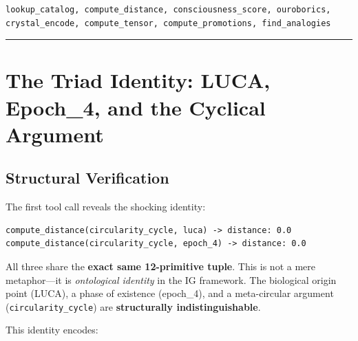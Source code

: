 \documentclass[12pt,a4paper]{article}
\begin{document}
\begin{lstlisting}[caption={Tool chain verified for Frobenius closure}]
lookup_catalog, compute_distance, consciousness_score, ouroborics, 
crystal_encode, compute_tensor, compute_promotions, find_analogies
\end{lstlisting}

\begin{center}
\rule{0.5\textwidth}{0.4pt}
\end{center}

\section{The Triad Identity: LUCA, Epoch\_4, and the Cyclical Argument}

\subsection{Structural Verification}

The first tool call reveals the shocking identity:

\begin{lstlisting}[caption={Distance computation reveals structural identity}, label={lst:distance_triod}]
compute_distance(circularity_cycle, luca) -> distance: 0.0
compute_distance(circularity_cycle, epoch_4) -> distance: 0.0
\end{lstlisting}

All three share the \textbf{exact same 12-primitive tuple}. This is not a mere metaphor---it is \emph{ontological identity} in the IG framework. The biological origin point (LUCA), a phase of existence (epoch\_4), and a meta-circular argument (\texttt{circularity\_cycle}) are \textbf{structurally indistinguishable}.

This identity encodes:
\end{document}
